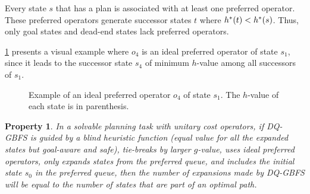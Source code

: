 \documentclass[ppgc,diss,english]{iiufrgs}
\newcommand{\textred}[1]{{\color{myred} #1}}
\newtheorem{property}{Property}
\begin{document}
Every state $s$ that has a plan is associated with at least one preferred operator. These preferred operators generate successor states $t$ where $h^*({t}) < h^*({s})$. Thus, only goal states and dead-end states lack preferred operators.

\cref{fig:pot-example} presents a visual example where $o_{4}$ is an ideal preferred operator of state $s_{1}$, since it leads to the successor state $s_{4}$ of minimum $h$-value among all successors of $s_{1}$.

\begin{figure}[htb]
\caption[Example of an ideal preferred operators]{Example of an ideal preferred operator $o_{4}$ of state $s_{1}$. The $h$-value of each state is in parenthesis.}
\vspace{\baselineskip}
\centering
{}
\label{fig:pot-example}
\end{figure}


\begin{property}
\label{prop:ideal-optimal}
In a solvable planning task with unitary cost operators, if DQ-GBFS is guided by a blind heuristic function (equal value for all the expanded states but goal-aware and safe), tie-breaks by larger $g$-value, uses ideal preferred operators, only expands states from the preferred queue, and includes the initial state $s_{0}$ in the preferred queue, then the number of expansions made by DQ-GBFS will be equal to the number of states that are part of an optimal path.
\end{property}
\end{document}
